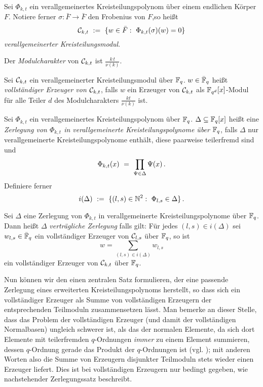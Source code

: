\begin{definition}
  \label{def:verallgemeinerter_kreisteilungsmodul}
  Sei $\Phi_{k,t}$ ein verallgemeinertes Kreisteilungspolynom über einem
  endlichen Körper $F$. Notiere ferner $\sigma: \bar F\to \bar F$ 
  den Frobenius von $F$,so heißt
  \[ \C_{k,t} \speq{:=} \{ w \in \bar F:\ \Phi_{k,t}(\sigma)(w) = 0 \}\]
  \emph{verallgemeinerter Kreisteilungsmodul}.

  Der \emph{Modulcharakter} von $\mathcal{C}_{k,t}$ ist $\frac{k\,t}{\nu(k)}$.
\end{definition}

\begin{definition}
  \label{def:vollst_erzeuger}
  Sei $\mathcal{C}_{k,t}$ ein verallgemeinerter Kreisteilungsmodul über $\mathbb{F}_q$.
  $w \in \bar {\mathbb{F}}_q$ heißt 
  \emph{vollständiger Erzeuger von $\mathcal{C}_{k,t}$}, falls
  $w$ ein Erzeuger von $\mathcal{C}_{k,t}$ als $\mathbb{F}_{q^d}[x]$-Modul 
  für alle Teiler $d$ des Modulcharakters $\frac{kt}{\nu(k)}$ ist.
\end{definition}

\begin{definition}
  Sei $\Phi_{k,t}$ ein verallgemeinertes Kreisteilungspolynom über $\mathbb{F}_q$.
  $\Delta \subseteq \mathbb{F}_q[x]$ heißt eine 
  \emph{Zerlegung von $\Phi_{k,t}$ in verallgemeinerte Kreisteilungspolynome
  über $\mathbb{F}_q$}, 
  falls $\Delta$ nur verallgemeinerte Kreisteilungspolynome enthält, diese
  paarweise teilerfremd sind und
  \[ \Phi_{k,t}(x) \ =\  \prod_{\Psi \in \Delta} \Psi(x)\,. \]
  Definiere ferner
  \[ i(\Delta) \speq{:=} \{ (l,s) \in \N^2:\ 
    \Phi_{l,s} \in \Delta\}\,.\]
\end{definition}


\begin{definition}
  \label{def:vertraeglich}
  Sei $\Delta$ eine Zerlegung von $\Phi_{k,t}$ in verallgemeinerte
  Kreisteilungspolynome über $\mathbb{F}_q$.
  Dann heißt $\Delta$ 
  \emph{verträgliche Zerlegung} falls gilt: Für jedes 
  $(l,s) \in i(\Delta)$ sei
  $w_{l,s} \in \bar {\mathbb{F}}_q$ ein vollständiger Erzeuger von 
  $\mathcal{C}_{l,s}$ über $\mathbb{F}_q$,
  so ist 
  \[ w = \sum_{(l,s) \in i(\Delta)} w_{l,s} \]
  ein vollständiger Erzeuger von $\mathcal{C}_{k,t}$ über $\mathbb{F}_q$.
\end{definition}


Nun können wir den einen zentralen Satz formulieren, der eine passende
Zerlegung eines erweiterten Kreisteilungspolynoms herstellt, so dass sich ein
vollständiger Erzeuger als Summe von vollständigen Erzeugern der entsprechenden
Teilmoduln zusammensetzen lässt. Man bemerke an dieser Stelle, dass das Problem
der vollständigen Erzeuger (und damit der vollständigen Normalbasen) ungleich
schwerer ist, als das der normalen Elemente, da sich dort Elemente 
mit teilerfremden $q$-Ordnungen \emph{immer} zu einem Element summieren, dessen
$q$-Ordnung gerade das Produkt der $q$-Ordnungen ist 
(vgl. ); mit anderen Worten 
also die Summe von Erzeugern disjunkter Teilmoduln stets wieder einen Erzeuger
liefert. Dies ist bei vollständigen Erzeugern nur bedingt gegeben, wie
nachstehender Zerlegungssatz beschreibt.

